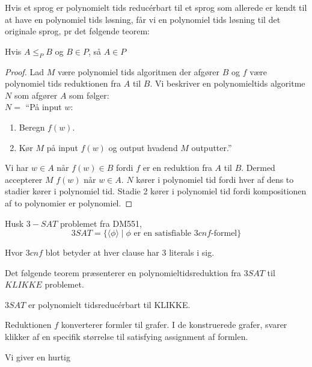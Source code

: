 Hvis et sprog er polynomielt tids reducérbart til et sprog som allerede er kendt til at have en polynomiel tids løsning, får vi en polynomiel tids løsning til det originale sprog, pr det følgende teorem:

\begin{theorem}
Hvis $A \le_{P} B$ og $B \in P$, så $A \in P$
\end{theorem}

\begin{proof}
  Lad $M$ være polynomiel tids algoritmen der afgører $B$ og $f$ være polynomiel tids reduktionen fra $A$ til $B$. Vi beskriver en polynomieltids algoritme $N$ som afgører $A$ som følger:\\
  \noindent
  $N = $ ``På input $w$:
  \begin{enumerate}
    \item Beregn $f(w)$.
    \item Kør $M$ på input $f(w)$ og output hvadend $M$ outputter.''
  \end{enumerate}

Vi har $w \in A$ når $f(w) \in B$ fordi $f$ er en reduktion fra $A$ til $B$. Dermed accepterer $M$ $f(w)$ når $w \in A$. $N$ kører i polynomiel tid fordi hver af dens to stadier kører i polynomiel tid. Stadie 2 kører i polynomiel tid fordi kompositionen af to polynomier er polynomiel.
\end{proof}

Husk $3-SAT$ problemet fra DM551,
\begin{equation*}
  3SAT = \{ \langle \phi \rangle \mid \phi \text{ er en satisfiable }3cnf\text{-formel}\}
\end{equation*}

Hvor $3cnf$ blot betyder at hver clause har 3 literals i sig.

Det følgende teorem præsenterer en polynomieltidsreduktion fra $3SAT$ til $KLIKKE$ problemet.

\begin{theorem}
$3SAT$ er polynomielt tidsreducérbart til KLIKKE.
\end{theorem}

Reduktionen $f$ konverterer formler til grafer. I de konstruerede grafer, svarer klikker af en specifik størrelse til satisfying assignment af formlen.

Vi giver en hurtig

